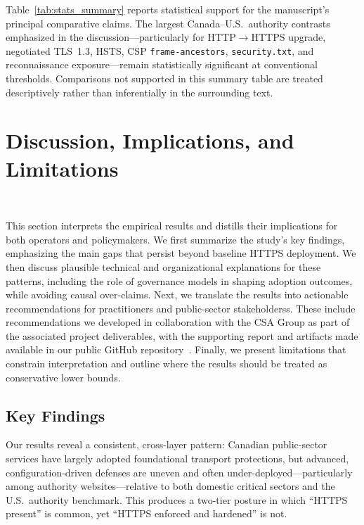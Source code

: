 \documentclass[a4paper,fleqn]{cas-sc}
\begin{document}
Table~\ref{tab:stats_summary} reports statistical support for the manuscript's principal comparative claims. The largest Canada--U.S.\ authority contrasts emphasized in the discussion—particularly for HTTP$\rightarrow$HTTPS upgrade, negotiated TLS~1.3, HSTS, CSP \texttt{frame-ancestors}, \texttt{security.txt}, and reconnaissance exposure—remain statistically significant at conventional thresholds. Comparisons not supported in this summary table are treated descriptively rather than inferentially in the surrounding text.

\section{Discussion, Implications, and Limitations}~\label{sec:discussion}

    This section interprets the empirical results and distills their implications for both operators and policymakers. 
    We first summarize the study's key findings, emphasizing the main gaps that persist beyond baseline HTTPS deployment. 
    We then discuss plausible technical and organizational explanations for these patterns, including the role of governance models in shaping adoption outcomes, while avoiding causal over-claims. 
    Next, we translate the results into actionable recommendations for practitioners and public-sector stakeholderss. 
    These include recommendations we developed in collaboration with the CSA Group as part of the associated project deliverables, with the supporting report and artifacts made available in our public GitHub repository~\cite{latta_scanner_2026}. Finally, we present limitations that constrain interpretation and outline where the results should be treated as conservative lower bounds.

\subsection{Key Findings}\label{sec:key_findings}
    Our results reveal a consistent, cross-layer pattern: 
    Canadian public-sector services have largely adopted foundational transport protections, but advanced, configuration-driven defenses are uneven and often under-deployed—particularly among authority websites—relative to both domestic critical sectors and the U.S.\ authority benchmark.
    This produces a two-tier posture in which ``HTTPS present'' is common, yet ``HTTPS enforced and hardened'' is not.
\end{document}
